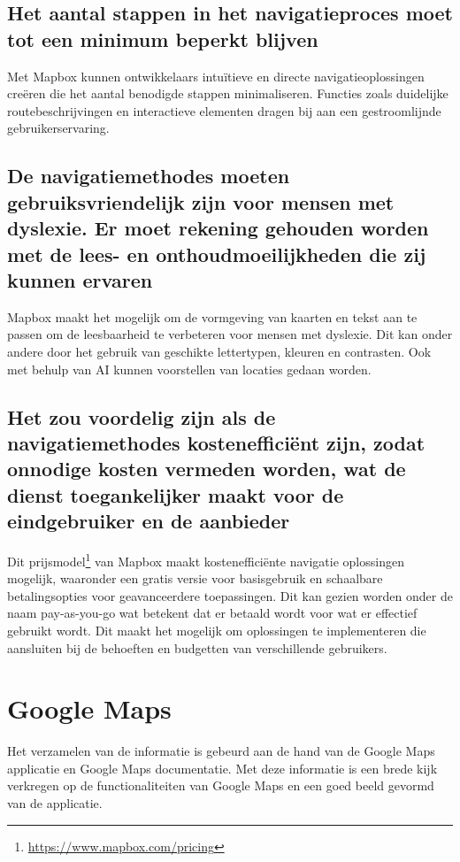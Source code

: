 \subsection*{Het aantal stappen in het navigatieproces moet tot een minimum beperkt blijven}
Met Mapbox kunnen ontwikkelaars intuïtieve en directe navigatieoplossingen creëren die het aantal benodigde stappen minimaliseren. Functies zoals duidelijke routebeschrijvingen en interactieve elementen dragen bij aan een gestroomlijnde gebruikerservaring.

\subsection*{De navigatiemethodes moeten gebruiksvriendelijk zijn voor mensen met dyslexie. Er moet rekening gehouden worden met de lees- en onthoudmoeilijkheden die zij kunnen ervaren}
Mapbox maakt het mogelijk om de vormgeving van kaarten en tekst aan te passen om de leesbaarheid te verbeteren voor mensen met dyslexie. Dit kan onder andere door het gebruik van geschikte lettertypen, kleuren en contrasten. Ook met behulp van AI kunnen voorstellen van locaties gedaan worden.

\subsection*{Het zou voordelig zijn als de navigatiemethodes kostenefficiënt zijn, zodat onnodige kosten vermeden worden, wat de dienst toegankelijker maakt voor de eindgebruiker en de aanbieder}

Dit prijsmodel\footnote{\url{https://www.mapbox.com/pricing}} van Mapbox maakt kostenefficiënte navigatie oplossingen mogelijk, waaronder een gratis versie voor basisgebruik en schaalbare betalingsopties voor geavanceerdere toepassingen. Dit kan gezien worden onder de naam pay-as-you-go wat betekent dat er betaald wordt voor wat er effectief gebruikt wordt. Dit maakt het mogelijk om oplossingen te implementeren die aansluiten bij de behoeften en budgetten van verschillende gebruikers. 

\section{Google Maps}
\label{sec:google maps}

Het verzamelen van de informatie is gebeurd aan de hand van de Google Maps applicatie en Google Maps documentatie. Met deze informatie is een brede kijk verkregen op de functionaliteiten van Google Maps en een goed beeld gevormd van de applicatie.

